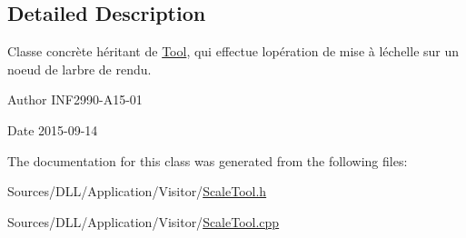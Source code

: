\subsection{Detailed Description}
Classe concrète héritant de \hyperlink{class_tool}{Tool}, qui effectue l\textquotesingle{}opération de mise à l\textquotesingle{}échelle sur un noeud de l\textquotesingle{}arbre de rendu. 

\begin{DoxyAuthor}{Author}
I\+N\+F2990-\/\+A15-\/01 
\end{DoxyAuthor}
\begin{DoxyDate}{Date}
2015-\/09-\/14 
\end{DoxyDate}


The documentation for this class was generated from the following files\+:\begin{DoxyCompactItemize}
\item 
Sources/\+D\+L\+L/\+Application/\+Visitor/\hyperlink{_scale_tool_8h}{Scale\+Tool.\+h}\item 
Sources/\+D\+L\+L/\+Application/\+Visitor/\hyperlink{_scale_tool_8cpp}{Scale\+Tool.\+cpp}\end{DoxyCompactItemize}
